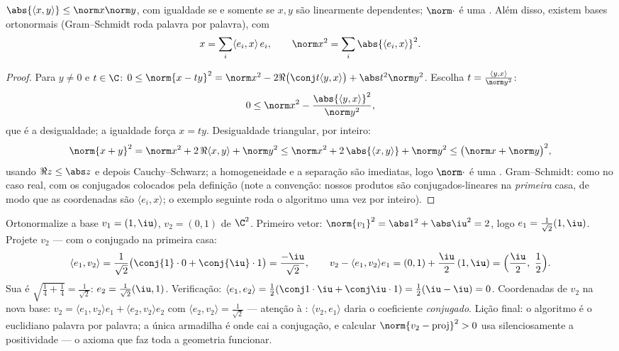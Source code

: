 \begin{theorem}\label{thm:b2:hermitian:cs}
$\abs{\langle x, y\rangle} \leq \norm x \norm y$, com igualdade se e somente se
$x, y$ são linearmente dependentes; $\norm\cdot$ é uma . Além disso,
existem bases ortonormais (Gram--Schmidt roda palavra por palavra), com
\[
x = \sum_i \langle e_i, x\rangle\, e_i,
\qquad
\norm x^2 = \sum_i \abs{\langle e_i, x\rangle}^2 .
\]
\end{theorem}

\begin{proof}
Para $y \neq 0$ e $t \in \C$: $0 \leq \norm{x - ty}^2 = \norm x^2
- 2\Re\bigl(\conj t\langle y, x\rangle\bigr) + \abs t^2\norm y^2$.
Escolha $t = \frac{\langle y, x\rangle}{\norm y^2}$:
\[
0 \leq \norm x^2 - \frac{\abs{\langle y, x\rangle}^2}{\norm y^2},
\]
que é a desigualdade; a igualdade força $x = ty$. Desigualdade
triangular, por inteiro:
\[
\norm{x + y}^2 = \norm x^2 + 2\,\Re\langle x, y\rangle
+ \norm y^2
\leq \norm x^2 + 2\,\abs{\langle x, y\rangle} + \norm y^2
\leq \bigl(\norm x + \norm y\bigr)^2 ,
\]
usando $\Re z \leq \abs z$ e depois Cauchy--Schwarz; a homogeneidade
e a separação são imediatas, logo $\norm\cdot$ é uma .
Gram--Schmidt: como no caso real, com os conjugados
colocados pela definição (note a convenção: nossos produtos são
conjugados-lineares na \emph{primeira} casa, de modo que as coordenadas são
$\langle e_i, x\rangle$; o exemplo seguinte roda o algoritmo
uma vez por inteiro).
\end{proof}

\begin{example}\label{ex:b2:hermitian:gramschmidt}
Ortonormalize a base $v_1 = (1, \iu)$, $v_2 = (0, 1)$ de
$\C^2$. Primeiro vetor: $\norm{v_1}^2 = \abs1^2 + \abs\iu^2 = 2$,
logo $e_1 = \frac{1}{\sqrt2}(1, \iu)$. Projete $v_2$ --- com o
conjugado na primeira casa:
\[
\langle e_1, v_2\rangle
= \frac{1}{\sqrt2}\bigl(\conj{1}\cdot0 +
\conj{\iu}\cdot1\bigr)
= \frac{-\iu}{\sqrt2} ,
\qquad
v_2 - \langle e_1, v_2\rangle e_1
= (0,1) + \frac{\iu}{2}\,(1, \iu)
= \Bigl(\frac\iu2,\ \frac12\Bigr) .
\]
Sua  é $\sqrt{\frac14 + \frac14} = \frac{1}{\sqrt2}$:
$e_2 = \frac{1}{\sqrt2}(\iu, 1)$. Verificação: $\langle e_1,
e_2\rangle = \frac12(\conj1\cdot\iu + \conj\iu\cdot1) =
\frac12(\iu - \iu) = 0$. Coordenadas de $v_2$ na nova base:
$v_2 = \langle e_1, v_2\rangle e_1 + \langle e_2, v_2\rangle
e_2$ com $\langle e_2, v_2\rangle = \frac{1}{\sqrt2}$ ---
atenção à : $\langle v_2, e_1\rangle$ daria o
coeficiente \emph{conjugado}. Lição final: o algoritmo é o
euclidiano palavra por palavra; a única armadilha é onde cai a
conjugação, e calcular $\norm{v_2 -
\text{proj}}^2 > 0$ usa silenciosamente a positividade --- o axioma
que faz toda a geometria funcionar.
\end{example}

